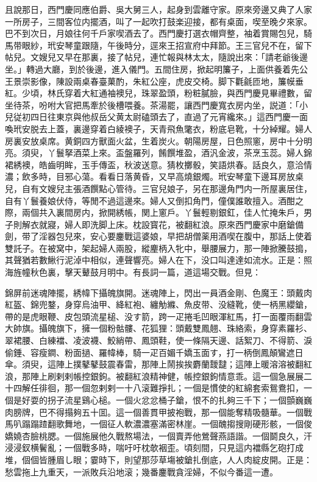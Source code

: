 且說那日，西門慶同應伯爵、吳大舅三人，起身到雲離守家。原來旁邊又典了人家一所房子，三間客位内擺酒，叫了一起吹打鼓楽迎接，都有桌面，喫至晚夕來家。巴不到次日，月娘往何千戶家喫酒去了。西門慶打選衣帽齊整，袖着賞賜包兒，騎馬带眼紗，玳安琴童跟隨，午後時分，逕來王招宣府中拜節。王三官兒不在，留下帖兒。文嫂兒又早在那裏，接了帖兒，連忙報與林太太，隨說出來：「請老爺後邊坐。」轉過大廳，到於後邊，進入儀門。五間住房，掀起明簾子，上面供養着先公王景崇影像，陳設兩桌春臺菓酌，朱紅公座，虎皮交椅。脚下氍毹匝地，簾幙垂紅。少頃，林氏穿着大紅通袖襖兒，珠翠盈頭，粉粧膩臉，與西門慶見畢禮數，留坐待茶，吩咐大官把馬牽於後槽喂養。茶湯罷，讓西門慶寬衣房内坐，説道：「小兒従初四日往東京與他叔岳父黄太尉磕頭去了，直過了元宵纔來。」這西門慶一面喚玳安脱去上蓋，裏邊穿着白綾襖子，天青飛魚氅衣，粉底皂靴，十分綽耀。婦人房裏安放桌席。黄銅四方獸面火盆，生着炭火。朝陽房屋，日色照窻，房中十分明亮。須臾，丫鬟拏酒菜上來。盃盤羅列，餚饌堆盈，酒汎金波，茶烹玉蕊。婦人錦裙綉襖，皓齒明眸，玉手傳盃，秋波送意。猜枚擲骰，笑語烘春。話良久，意洽情濃；飲多時，目邪心蕩。看看日落黄昏，又早高燒銀燭。玳安琴童下邊耳房放桌兒，自有文嫂兒主張酒饌點心管待。三官兒娘子，另在那邊角門内一所屋裏居住，自有丫鬟養娘伏侍，等閒不過這邊來。婦人又倒扣角門，僮僕誰敢擅入。酒酣之際，兩個共入裏間房内，掀開綉帳，関上窻戶。丫鬟輕剔銀釭，佳人忙掩朱戶，男子則解衣就寢，婦人即洗脚上床。枕設寳花，被翻紅浪。原來西門慶家中磨鎗備劍，带了淫器包兒來，安心要鏖戰這婆娘，早把胡僧薬用酒喫在腹中，那話上使着雙託子。在被窝中，架起婦人兩股，縱麈柄入牝中，舉腰展力，那一陣掀騰鼓搗，其聲猶若數鰍行泥淖中相似，連聲響亮。婦人在下，没口叫達達如流水。正是：照海旌幢秋色裏，擊天鼙鼓月明中。有長詞一篇，道這場交戰。但見：

\begin{myquote}
錦屏前迷魂陣擺，綉幃下攝魄旗開。迷魂陣上，閃出一員酒金剛、色魔王：頭戴肉紅盔、錦兜鍪，身穿烏油甲、絳紅袍、纏觔縧、魚皮带、没縫靴，使一柄黑纓鎗，帶的是虎眼鞭、皮包頭流星槌、没す箭，跨一疋捲毛凹眼渾紅馬，打一面覆雨翻雲大帥旗。攝魄旗下，擁一個粉骷髏、花狐狸：頭戴雙鳳翹、珠絡索，身穿素羅衫、翠裙腰、白練襠、凌波襪、鮫綃帶、鳳頭鞋，使一條隔天邊、話絮刀、不得箭、淚偷錘、容瘦鐧、粉面撾、羅幃棒，騎一疋百媚千嬌玉面す，打一柄倒鳳顛鸞遮日傘。須臾，這陣上撲鼕鼕鼓震春雷，那陣上鬧挨挨麝蘭靉靆；這陣上暖溶溶被翻紅浪，那陣上刷剌剌帳控銀鉤。被翻紅浪精神健，帳控銀鉤情意乖。這一個急展展二十四解任徘徊，那一個忽剌剌一十八滚難掙扎；一個是慣使的紅綿套索鴛鴦扣，一個是好耍的拐子流星鷄心槌。一個火忿忿桶子鎗，恨不的扎夠三千下；一個顫巍巍肉膀牌，巴不得搨夠五十囬。這一個善貫甲披袍戰，那一個能奪精吸髓華。一個戰馬叭蹋蹋蹅翻歌舞地，一個征人軟濃濃塞滿密林崖。一個醜搊搜剛硬形骸，一個俊嬌嬈杏臉桃腮。一個施展他久戰熬場法，一個賣弄他鶯聲燕語諧。一個鬬良久，汗浸浸釵横鬢亂；一個戰多時，喘吁吁枕欹裀歪。頃刻間，只見這内襠縣乞砲打成堆，個個皆腫眉し眼；霎時下，則望那莎草塲被鎗扎倒底，人人肉綻皮開。正是：愁雲拖上九重天，一派敗兵沿地滚；幾番鏖戰貪淫婦，不似今番這一遭。
\end{myquote}

